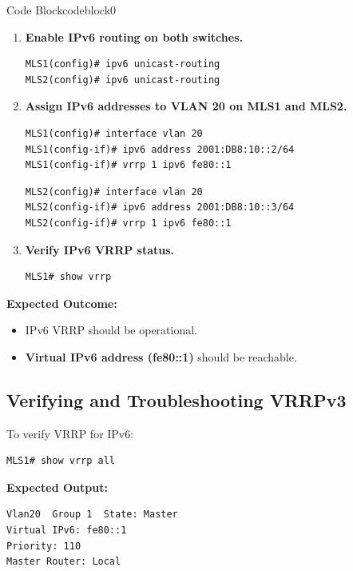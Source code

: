 \documentclass[a4paper]{book}
\begin{document}
\begin{ocg}{Code Block}{codeblock}{0}

\vspace{0.5cm}
\begin{enumerate}
\item \textbf{Enable IPv6 routing on both switches.}
\begin{lstlisting}
MLS1(config)# ipv6 unicast-routing
MLS2(config)# ipv6 unicast-routing
\end{lstlisting}

\item \textbf{Assign IPv6 addresses to VLAN 20 on MLS1 and MLS2.}
\begin{lstlisting}
MLS1(config)# interface vlan 20
MLS1(config-if)# ipv6 address 2001:DB8:10::2/64
MLS1(config-if)# vrrp 1 ipv6 fe80::1
\end{lstlisting}
\begin{lstlisting}
MLS2(config)# interface vlan 20
MLS2(config-if)# ipv6 address 2001:DB8:10::3/64
MLS2(config-if)# vrrp 1 ipv6 fe80::1
\end{lstlisting}

\item \textbf{Verify IPv6 VRRP status.}
\begin{lstlisting}
MLS1# show vrrp
\end{lstlisting}
\end{enumerate}
\end{ocg}




\textbf{Expected Outcome:}
\begin{itemize}
\item IPv6 VRRP should be operational.
\item \textbf{Virtual IPv6 address (fe80::1)} should be reachable.
\end{itemize}

\subsection{Verifying and Troubleshooting VRRPv3}
To verify VRRP for IPv6:
\begin{lstlisting}
MLS1# show vrrp all
\end{lstlisting}

\textbf{Expected Output:}
\begin{lstlisting}
Vlan20  Group 1  State: Master
Virtual IPv6: fe80::1
Priority: 110
Master Router: Local
\end{lstlisting}
\end{document}
